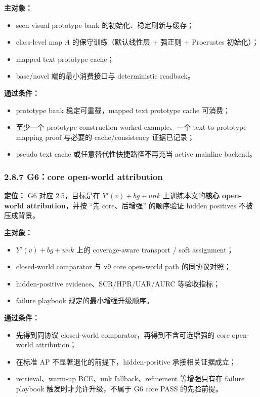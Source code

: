 \documentclass[UTF8]{ctexart}
\begin{document}
\textbf{主对象：}
\begin{itemize}
\item seen visual prototype bank 的初始化、稳定刷新与缓存；
\item class-level map $A$ 的保守训练（默认线性层 + 强正则 + Procrustes 初始化）；
\item mapped text prototype cache；
\item base/novel 端的最小消费接口与 deterministic readback。
\end{itemize}

\textbf{通过条件：}
\begin{itemize}
\item prototype bank 稳定可重载，mapped text prototype cache 可消费；
\item 至少一个 prototype construction worked example、一个 text-to-prototype mapping proof 与必要的 cache/consistency 证据已记录；
\item pseudo text cache 或任意替代性快捷路径\textbf{不}再充当 active mainline backend。
\end{itemize}

\subsubsection*{2.8.7 G6：core open-world attribution}
\textbf{定位：} G6 对应 2.5，目标是在 $Y'(v)+bg+unk$ 上训练本文的\textbf{核心 open-world attribution}，并按 ``先 core、后增强'' 的顺序验证 hidden positives 不被压成背景。

\textbf{主对象：}
\begin{itemize}
\item $Y'(v)+bg+unk$ 上的 coverage-aware transport / soft assignment；
\item closed-world comparator 与 v9 core open-world path 的同协议对照；
\item hidden-positive evidence、SCR/HPR/UAR/AURC 等验收指标；
\item failure playbook 规定的最小增强升级顺序。
\end{itemize}

\textbf{通过条件：}
\begin{itemize}
\item 先得到同协议 closed-world comparator，再得到不含可选增强的 core open-world attribution；
\item 在标准 AP 不显著退化的前提下，hidden-positive 承接相关证据成立；
\item retrieval、warm-up BCE、unk fallback、refinement 等增强只有在 failure playbook 触发时才允许升级，不属于 G6 core PASS 的先验前提。
\end{itemize}
\end{document}
